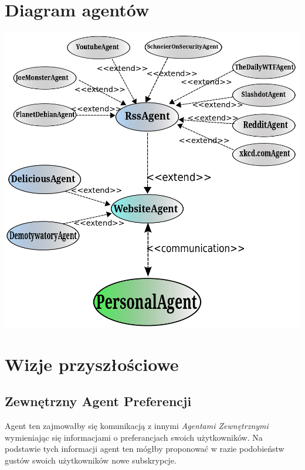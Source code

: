 \documentclass[a4paper,11pt]{report}
\begin{document}
\section{Diagram agentów}

\begin{center}
 \includegraphics[scale=0.45]{./diagrams/agent_case1.png}
\end{center}

\newpage
\section{Wizje przyszłościowe}


\subsection{Zewnętrzny Agent Preferencji}
Agent ten zajmowałby się komunikacją z innymi \textit{Agentami Zewnętrznymi}
wymieniając się informacjami o preferancjach swoich użytkowników. Na podstawie
tych informacji agent ten mógłby proponować w razie podobieństw gustów swoich
użytkowników nowe subskrypcje. 
\end{document}
